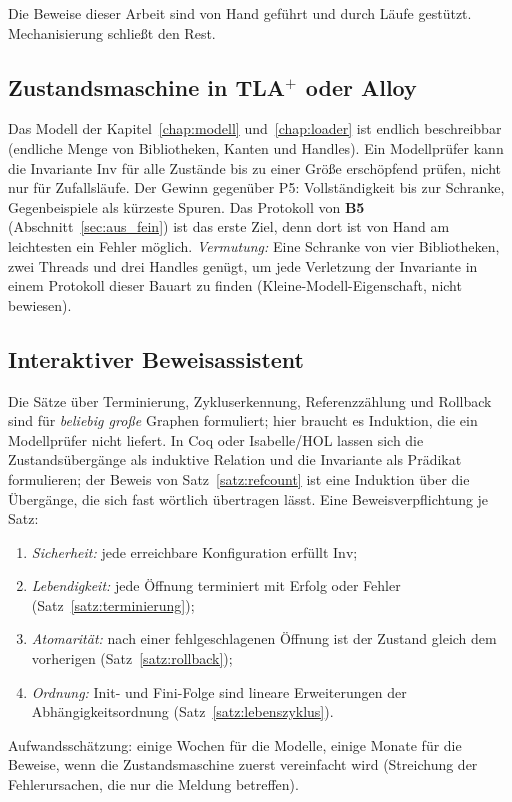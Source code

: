 \documentclass[a4paper,12pt,twoside]{report}
\DeclareRobustCommand{\_}{\ifmmode\mbox{\textunderscore}\else\textunderscore\allowbreak{}\fi}
\theoremstyle{definition}
\newcommand{\Bf}[1]{\textbf{B#1}}
\begin{document}
Die Beweise dieser Arbeit sind von Hand geführt und durch Läufe gestützt. Mechanisierung schließt den Rest.

\subsection{Zustandsmaschine in TLA$^+$ oder Alloy}
Das Modell der Kapitel~\ref{chap:modell} und~\ref{chap:loader} ist endlich beschreibbar (endliche Menge von Bibliotheken, Kanten und Handles). Ein Modellprüfer kann die Invariante $\mathrm{Inv}$ für alle Zustände bis zu einer Größe erschöpfend prüfen, nicht nur für Zufallsläufe. Der Gewinn gegenüber P5: Vollständigkeit bis zur Schranke, Gegenbeispiele als kürzeste Spuren. Das Protokoll von \Bf{5} (Abschnitt~\ref{sec:aus_fein}) ist das erste Ziel, denn dort ist von Hand am leichtesten ein Fehler möglich. \emph{Vermutung:} Eine Schranke von vier Bibliotheken, zwei Threads und drei Handles genügt, um jede Verletzung der Invariante in einem Protokoll dieser Bauart zu finden (Kleine-Modell-Eigenschaft, nicht bewiesen).

\subsection{Interaktiver Beweisassistent}
Die Sätze über Terminierung, Zykluserkennung, Referenzzählung und Rollback sind für \emph{beliebig große} Graphen formuliert; hier braucht es Induktion, die ein Modellprüfer nicht liefert. In Coq oder Isabelle/HOL lassen sich die Zustandsübergänge als induktive Relation und die Invariante als Prädikat formulieren; der Beweis von Satz~\ref{satz:refcount} ist eine Induktion über die Übergänge, die sich fast wörtlich übertragen lässt. Eine Beweisverpflichtung je Satz:
\begin{enumerate}[label=(\roman*)]
	\item \emph{Sicherheit:} jede erreichbare Konfiguration erfüllt $\mathrm{Inv}$;
	\item \emph{Lebendigkeit:} jede Öffnung terminiert mit Erfolg oder Fehler (Satz~\ref{satz:terminierung});
	\item \emph{Atomarität:} nach einer fehlgeschlagenen Öffnung ist der Zustand gleich dem vorherigen (Satz~\ref{satz:rollback});
	\item \emph{Ordnung:} Init- und Fini-Folge sind lineare Erweiterungen der Abhängigkeitsordnung (Satz~\ref{satz:lebenszyklus}).
\end{enumerate}
Aufwandsschätzung: einige Wochen für die Modelle, einige Monate für die Beweise, wenn die Zustandsmaschine zuerst vereinfacht wird (Streichung der Fehlerursachen, die nur die Meldung betreffen).
\end{document}
